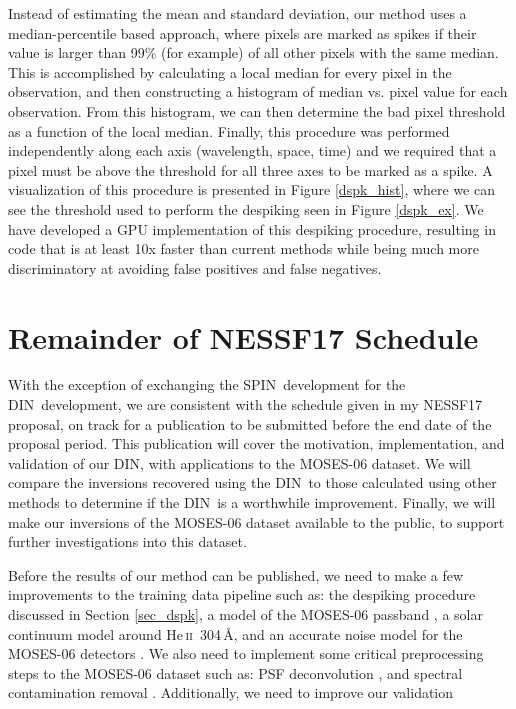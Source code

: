 \documentclass[10pt,letterpaper]{article}
\newcommand{\HeII}{He\,\textsc{ii}~304\,\AA}
\newcommand{\MOSES}{\ac{MOSES}}
\newcommand{\DIN}{\ac{DIN}}
\newcommand{\SPIN}{\ac{SPIN}}
\begin{document}
			Instead of estimating the mean and standard deviation, our method uses a median-percentile based approach, where pixels are marked as spikes if their value is larger than 99\% (for example) of all other pixels with the same median. 
			This is accomplished by calculating a local median for every pixel in the observation, and then constructing a histogram of median vs. pixel value for each observation.
			From this histogram, we can then determine the bad pixel threshold as a function of the local median.
			Finally, this procedure was performed independently along each axis (wavelength, space, time) and we required that a pixel must be above the threshold for all three axes to be marked as a spike.
			A visualization of this procedure is presented in Figure \ref{dspk_hist}, where we can see the threshold used to perform the despiking seen in Figure \ref{dspk_ex}.		
			We have developed a GPU implementation of this despiking procedure, resulting in code that is at least 10x faster than current methods while being much more discriminatory at avoiding false positives and false negatives.

		
	\section{Remainder of NESSF17 Schedule}
	
		With the exception of exchanging the \SPIN\ development for the \DIN\ development, we are consistent with the schedule given in my NESSF17 proposal, on track for a publication to be submitted before the end date of the proposal period.
		This publication will cover the motivation, implementation, and validation of our \DIN, with applications to the \MOSES-06 dataset.
		We will compare the inversions recovered using the \DIN\ to those calculated using other methods to determine if the \DIN\ is a worthwhile improvement.
		Finally, we will make our inversions of the \MOSES-06 dataset available to the public, to support further investigations into this dataset.
		
		Before the results of our method can be published, we need to make a few improvements to the training data pipeline such as: the despiking procedure discussed in Section \ref{sec_dspk}, a model of the \MOSES-06 passband \citep{Fox2011}, a solar continuum model around \HeII \citep{Fox2011}, and an accurate noise model for the \MOSES-06 detectors \cite{Rust2017}.
		We also need to implement some critical preprocessing steps to the \MOSES-06 dataset such as: PSF deconvolution \citep{Rust2017}, and spectral contamination removal \citep{Parker2016}.
		Additionally, we need to improve our validation 
	
\end{document}
